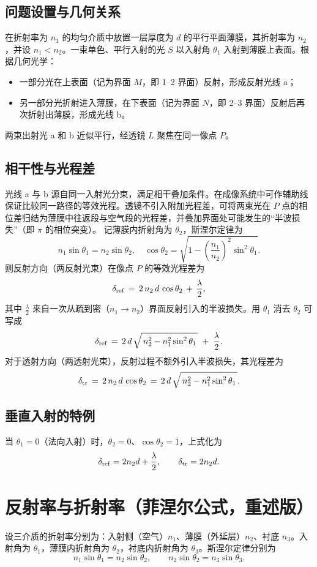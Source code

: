 \documentclass[withoutpreface,bwprint]{cumcmthesis} %
\begin{document}
\subsection{问题设置与几何关系}
在折射率为 \(n_1\) 的均匀介质中放置一层厚度为 \(d\) 的平行平面薄膜，其折射率为 \(n_2\)，并设 \(n_1<n_2\)。一束单色、平行入射的光 \(S\) 以入射角 \(\theta_1\) 入射到薄膜上表面。根据几何光学：
\begin{itemize}
    \item 一部分光在上表面（记为界面 \(M\)，即 1--2 界面）反射，形成反射光线 a；
    \item 另一部分光折射进入薄膜，在下表面（记为界面 \(N\)，即 2--3 界面）反射后再次折射出薄膜，形成光线 b。
\end{itemize}
两束出射光 a 和 b 近似平行，经透镜 \(L\) 聚焦在同一像点 \(P\)。

\subsection{相干性与光程差}
光线 a 与 b 源自同一入射光分束，满足相干叠加条件。在成像系统中可作辅助线保证比较同一路径的等效光程。透镜不引入附加光程差，可将两束光在 \(P\) 点的相位差归结为薄膜中往返段与空气段的光程差，并叠加界面处可能发生的“半波损失”（即 \(\pi\) 的相位突变）。
记薄膜内折射角为 \(\theta_2\)，斯涅尔定律为
\[
    n_1\sin\theta_1=n_2\sin\theta_2,\quad \cos\theta_2=\sqrt{1-\left(\frac{n_1}{n_2}\right)^2\sin^2\theta_1}.
\]
则反射方向（两反射光束）在像点 \(P\) 的等效光程差为
\[
    \delta_{\rm ref} \,=\, 2\,n_2\,d\,\cos\theta_2 \, + \, \frac{\lambda}{2},
\]
其中 \(\tfrac{\lambda}{2}\) 来自一次从疏到密（\(n_1\to n_2\)）界面反射引入的半波损失。用 \(\theta_1\) 消去 \(\theta_2\) 可写成
\[
    \delta_{\rm ref} \,=\, 2\,d\,\sqrt{\,n_2^2 - n_1^2\sin^2\theta_1\,}\; +\; \frac{\lambda}{2}.
\]
对于透射方向（两透射光束），反射过程不额外引入半波损失，其光程差为
\[
    \delta_{\rm tr} \,=\, 2\,n_2\,d\,\cos\theta_2 \,=\, 2\,d\,\sqrt{\,n_2^2 - n_1^2\sin^2\theta_1\,}.
\]

\subsection{垂直入射的特例}
当 \(\theta_1=0\)（法向入射）时，\(\theta_2=0\)、\(\cos\theta_2=1\)，上式化为
\[
    \delta_{\rm ref}=2n_2d+\frac{\lambda}{2},\qquad \delta_{\rm tr}=2n_2d.
\]

\section{反射率与折射率（菲涅尔公式，重述版）}
设三介质的折射率分别为：入射侧（空气）\(n_1\)、薄膜（外延层）\(n_2\)、衬底 \(n_3\)。入射角为 \(\theta_1\)，薄膜内折射角为 \(\theta_2\)，衬底内折射角为 \(\theta_3\)。斯涅尔定律分别为
\[
    n_1\sin\theta_1=n_2\sin\theta_2,\qquad n_2\sin\theta_2=n_3\sin\theta_3.
\]
\end{document}

